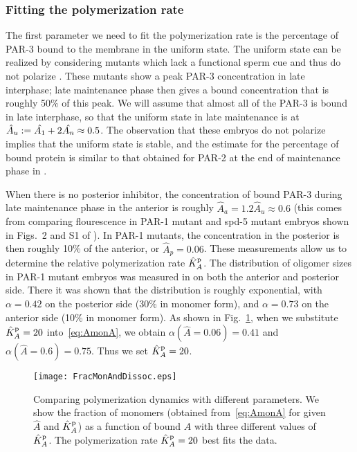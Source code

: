 \documentclass[11pt]{article}
\newcommand{\6}[1]{#1_{\text{6}}}
\newcommand{\3}[1]{#1_{\text{3}}}
\begin{document}
\subsubsection{Fitting the polymerization rate}
The first parameter we need to fit the polymerization rate is the percentage of PAR-3 bound to the membrane in the uniform state. The uniform state can be realized by considering mutants which lack a functional sperm cue and thus do not polarize \cite[Fig.~S1]{lang2023oligomerization}. These mutants show a peak PAR-3 concentration in late interphase; late maintenance phase then gives a bound concentration that is roughly 50\% of this peak. We will assume that almost all of the PAR-3 is bound in late interphase, so that the uniform state in late maintenance is at $\hat A_u:=\hat{A_1}+2\hat{A_n} \approx 0.5$. The observation that these embryos do not polarize implies that the uniform state is stable, and the estimate for the percentage of bound protein is similar to that obtained for PAR-2 at the end of maintenance phase in \cite[Fig.~S3]{gross2019guiding}. 

When there is no posterior inhibitor, the concentration of bound PAR-3 during late maintenance phase in the anterior is roughly $\hat A_a=1.2 \hat A_u \approx 0.6$ (this comes from comparing flourescence in PAR-1 mutant and spd-5 mutant embryos shown in Figs.\ 2 and S1 of \cite{lang2023oligomerization}). In PAR-1 mutants, the concentration in the posterior is then roughly 10\% of the anterior, or $\hat A_p=0.06$. These measurements allow us to determine the relative polymerization rate $\hat{K}^\text{p}_A$. The distribution of oligomer sizes in PAR-1 mutant embryos was measured in \cite{lang2023oligomerization} on both the anterior and posterior side. There it was shown that the distribution is roughly exponential, with $\alpha=0.42$ on the posterior side (30\% in monomer form), and $\alpha=0.73$ on the anterior side (10\% in monomer form). As shown in Fig.\ \ref{fig:FracMon}, when we substitute $\hat{K}^\text{p}_A=20$ into\ \eqref{eq:AmonA}, we obtain $\alpha(\hat A = 0.06)=0.41$ and $\alpha(\hat A = 0.6)=0.75$. Thus we set $\hat{K}^\text{p}_A=20$.

\begin{figure}
\centering
\texttt{[image: FracMonAndDissoc.eps]}
\caption{\label{fig:FracMon}Comparing polymerization dynamics with different parameters. We show the fraction of monomers (obtained from\ \eqref{eq:AmonA} for given $\hat A$ and $\hat{K}^\text{p}_A$) as a function of bound $\hat A$ with three different values of $\hat{K}^\text{p}_A$. The polymerization rate $\hat{K}^\text{p}_A=20$ best fits the data. }
\end{figure}
\end{document}
